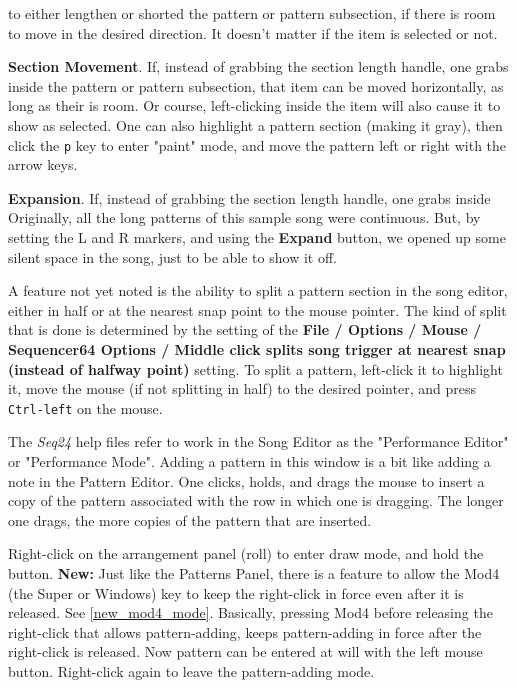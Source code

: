 \begin{enumber}
         to either lengthen or shorted the pattern or pattern subsection, if
         there is room to move in the desired direction.
         It doesn't matter if the item is selected or not.
      \item \textbf{Section Movement}.
         If, instead of grabbing the section length handle, one grabs inside
         the pattern or pattern subsection, that item can be moved
         horizontally, as long as their is room.  Or course, left-clicking
         inside the item will also cause it to show as selected.
         One can also highlight a pattern section (making it gray), then click
         the \texttt{p} key to enter "paint" mode, and move the pattern left or
         right with the arrow keys.
      \item \textbf{Expansion}.
         If, instead of grabbing the section length handle, one grabs inside
         Originally, all the long patterns of this sample song were continuous.
         But, by setting the L and R markers, and using the \textbf{Expand}
         button, we opened up some silent space in the song, just to be able
         to show it off.
   \end{enumber}

   A feature not yet noted is the ability to split a pattern section in the
   song editor, either in half or at the nearest snap point to the mouse
   pointer.  The kind of split that is done is determined by the
   setting of the \textbf{File / Options / Mouse / Sequencer64 Options /
   Middle click splits song trigger at nearest snap (instead of halfway point)}
   setting.  To split a pattern, left-click it to highlight it, move
   the mouse (if not splitting in half) to the desired pointer, and press
   \texttt{Ctrl-left} on the mouse.

   The \textsl{Seq24} help files refer to work in the Song Editor as the
   "Performance Editor" or "Performance Mode".  Adding a pattern in this
   window is a bit like adding a note in the Pattern Editor.
   One clicks, holds, and drags the mouse to insert a copy of the pattern
   associated with the row in which one is dragging.  The longer one drags,
   the more copies of the pattern that are inserted.

	Right-click on the arrangement panel (roll) to enter
   draw mode, and hold the button.
   \textbf{New:}
   Just like the Patterns Panel, there is a feature to allow the Mod4 (the
   Super or Windows) key to keep the right-click in force even after it is
   released.  See \ref{new_mod4_mode}.  Basically, pressing Mod4 before
   releasing the right-click that allows pattern-adding, keeps
   pattern-adding in force after the right-click is released.  Now pattern
   can be entered at will with the left mouse button.  Right-click again to
   leave the pattern-adding mode.

